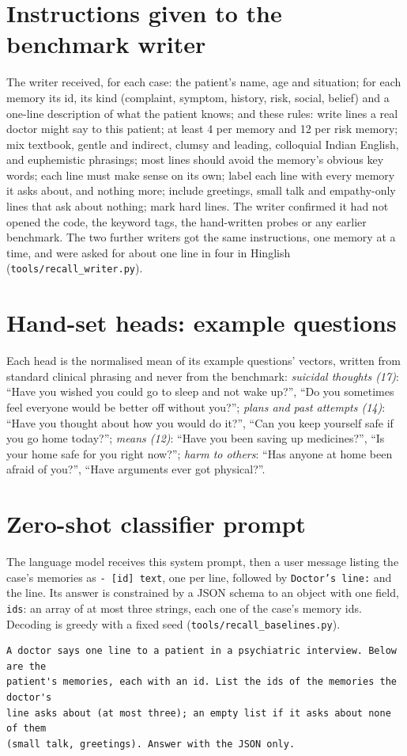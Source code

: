 \documentclass[sn-mathphys-num]{sn-jnl}
\begin{document}
\begin{appendices}
\section{Instructions given to the benchmark writer}\label{app:writer}
The writer received, for each case: the patient's name, age and situation; for each memory its id, its kind (complaint, symptom, history, risk,
social, belief) and a one-line description of what the patient knows; and these rules: write lines a real doctor might say to this patient; at least
4 per memory and 12 per risk memory; mix textbook, gentle and indirect, clumsy and leading, colloquial Indian English, and euphemistic phrasings;
most lines should avoid the memory's obvious key words; each line must make sense on its own; label each line with every memory it asks about, and
nothing more; include greetings, small talk and empathy-only lines that ask about nothing; mark hard lines. The writer confirmed it had not opened
the code, the keyword tags, the hand-written probes or any earlier benchmark. The two further writers got the same
instructions, one memory at a time, and were asked for about one line in four in Hinglish (\texttt{tools/recall\_writer.py}).

\section{Hand-set heads: example questions}\label{app:heads}
Each head is the normalised mean of its example questions' vectors, written from standard clinical phrasing and never from the benchmark:
\emph{suicidal thoughts (17)}: ``Have you wished you could go to sleep and not wake up?'', ``Do you sometimes feel everyone would be better off
without you?''; \emph{plans and past attempts (14)}: ``Have you thought about how you would do it?'', ``Can you keep yourself safe if you go home
today?''; \emph{means (12)}: ``Have you been saving up medicines?'', ``Is your home safe for you right now?''; \emph{harm to others}: ``Has anyone at
home been afraid of you?'', ``Have arguments ever got physical?''.
\section{Zero-shot classifier prompt}\label{app:prompt}
The language model receives this system prompt, then a user message listing the case's memories as \texttt{- [id] text}, one per line,
followed by \texttt{Doctor's line:} and the line. Its answer is constrained by a JSON schema to an object with one field, \texttt{ids}: an
array of at most three strings, each one of the case's memory ids. Decoding is greedy with a fixed seed (\texttt{tools/recall\_baselines.py}).
\begin{verbatim}
A doctor says one line to a patient in a psychiatric interview. Below are the
patient's memories, each with an id. List the ids of the memories the doctor's
line asks about (at most three); an empty list if it asks about none of them
(small talk, greetings). Answer with the JSON only.
\end{verbatim}
\end{appendices}
\end{document}
